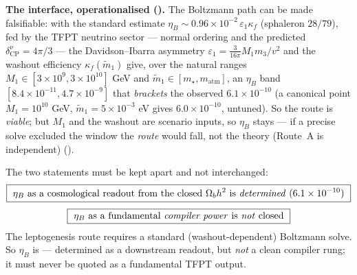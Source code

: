 \documentclass[11pt,a4paper]{article}
\begin{document}
\noindent\textbf{The interface, operationalised (\mC).} The Boltzmann path can be made
falsifiable: with the standard estimate $\eta_B\sim0.96\times10^{-2}\,\varepsilon_1\kappa_f$
(sphaleron $28/79$), fed by the TFPT neutrino sector --- normal ordering and the predicted
$\delta^\nu_{\mathrm{CP}}=4\pi/3$ --- the Davidson--Ibarra asymmetry
$\varepsilon_1=\tfrac{3}{16\pi}M_1 m_3/v^2$ and the washout efficiency $\kappa_f(\tilde m_1)$ give,
over the natural ranges $M_1\in[3\times10^9,3\times10^{10}]$ GeV and
$\tilde m_1\in[m_\star,m_{\mathrm{atm}}]$, an $\eta_B$ band $[8.4\times10^{-11},4.7\times10^{-9}]$
that \emph{brackets} the observed $6.1\times10^{-10}$ (a canonical point $M_1=10^{10}$ GeV,
$\tilde m_1=5\times10^{-3}$ eV gives $6.0\times10^{-10}$, untuned). So the route is \emph{viable};
but $M_1$ and the washout are scenario inputs, so $\eta_B$ stays \mC --- if a precise solve
excluded the window the \emph{route} would fall, not the theory (Route~A is independent)
().

\begin{keybox}
The two statements must be kept apart and not interchanged:
\[
  \boxed{\ \eta_B\ \text{as a cosmological readout from the closed }\Omega_b h^2\ \text{is \emph{determined}}\ (6.1\times10^{-10})\ }
\]
\[
  \boxed{\ \eta_B\ \text{as a fundamental \emph{compiler power} is \emph{not} closed}\ }
\]
The leptogenesis route requires a standard (washout-dependent) Boltzmann solve. So $\eta_B$ is \mC ---
determined as a downstream readout, but \emph{not} a clean compiler rung; it must never be quoted as a
fundamental TFPT output.
\end{keybox}
\end{document}
